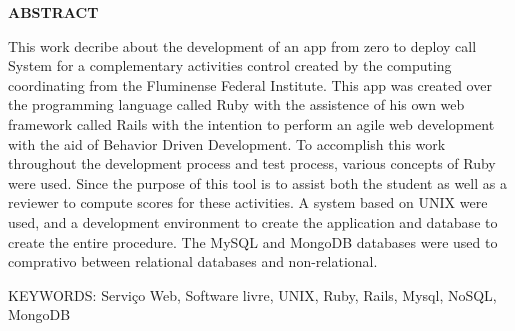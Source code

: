 \begin{center}
\textbf{ABSTRACT}
\end{center}

\singlespacing

\noindent

This work decribe about the development of an app from zero to deploy call System for a complementary activities control created by 
the computing coordinating from the Fluminense Federal Institute. This app was created over the programming language called Ruby with
the assistence of his own web framework called Rails with the intention to perform an agile web development with the aid of Behavior Driven Development.
To accomplish this work throughout the development process and test process, various concepts of Ruby were used. Since the purpose of this tool is to assist
both the student as well as a reviewer to compute scores for these activities. A system based on UNIX were used, and a development environment to create 
the application and database to create the entire procedure. The MySQL and MongoDB databases were used to comprativo between relational databases and non-relational.

\noindent KEYWORDS: Serviço Web, Software livre, UNIX,  Ruby, Rails, Mysql, NoSQL, MongoDB

